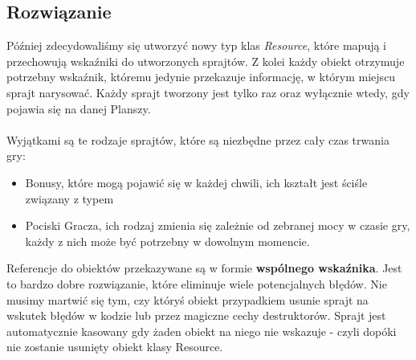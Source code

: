 \documentclass[a4paper,twoside]{article}
\begin{document}
			\subsection{Rozwiązanie}
				Później zdecydowaliśmy się utworzyć nowy typ klas \textit{Resource}, które mapują i przechowują wskaźniki do utworzonych sprajtów. Z kolei każdy obiekt otrzymuje potrzebny wskaźnik, któremu jedynie przekazuje informację, w którym miejscu sprajt narysować. Każdy sprajt tworzony jest tylko raz oraz wyłącznie wtedy, gdy pojawia się na danej Planszy.\\\\
				Wyjątkami są te rodzaje sprajtów, które są niezbędne przez cały czas trwania gry:
				\begin{itemize}
					\item Bonusy, które mogą pojawić się w każdej chwili, ich kształt jest ściśle związany z typem
					\item Pociski Gracza, ich rodzaj zmienia się zależnie od zebranej mocy w czasie gry, każdy z nich może być potrzebny w dowolnym momencie. 
				\end{itemize}
				Referencje do obiektów przekazywane są w formie \textbf{wspólnego wskaźnika}. Jest to bardzo dobre rozwiązanie, które eliminuje wiele potencjalnych błędów. Nie musimy martwić się tym, czy któryś obiekt przypadkiem usunie sprajt na wskutek błędów w kodzie lub przez magiczne cechy destruktorów. Sprajt jest automatycznie kasowany gdy żaden obiekt na niego nie wskazuje - czyli dopóki nie zostanie usunięty obiekt klasy Resource.
			
			
\end{document}
